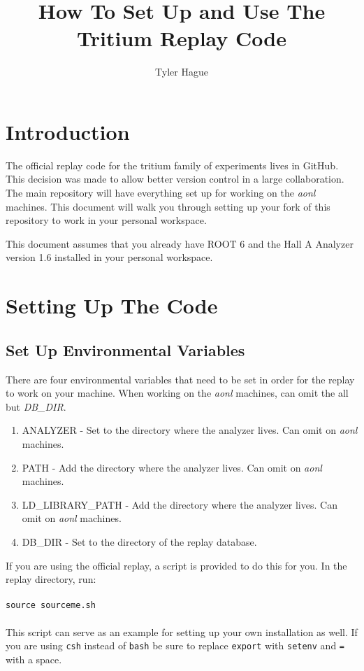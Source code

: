 \documentclass{report}
\begin{document}
\title{How To Set Up and Use The Tritium Replay Code}
\author{Tyler Hague}
\maketitle

\chapter{Introduction}
The official replay code for the tritium family of experiments lives in GitHub. This decision was made to allow better version control in a large collaboration. The main repository will have everything set up for working on the \textit{aonl} machines. This document will walk you through setting up your fork of this repository to work in your personal workspace.

This document assumes that you already have ROOT 6 and the Hall A Analyzer version 1.6 installed in your personal workspace.

\chapter{Setting Up The Code}

\section{Set Up Environmental Variables}

There are four environmental variables that need to be set in order for the replay to work on your machine. When working on the \textit{aonl} machines, can omit the all but \textit{DB\_DIR}.

\begin{enumerate}
\item ANALYZER - Set to the directory where the analyzer lives. Can omit on \textit{aonl} machines.
\item PATH - Add the directory where the analyzer lives. Can omit on \textit{aonl} machines.
\item LD\_LIBRARY\_PATH - Add the directory where the analyzer lives. Can omit on \textit{aonl} machines.
\item DB\_DIR - Set to the directory of the replay database.
\end{enumerate}

If you are using the official replay, a script is provided to do this for you. In the replay directory, run:
\\\\
\texttt{source sourceme.sh}
\\\\
This script can serve as an example for setting up your own installation as well. If you are using \texttt{csh} instead of \texttt{bash} be sure to replace \texttt{export} with \texttt{setenv} and \texttt{=} with a space.
\end{document}
